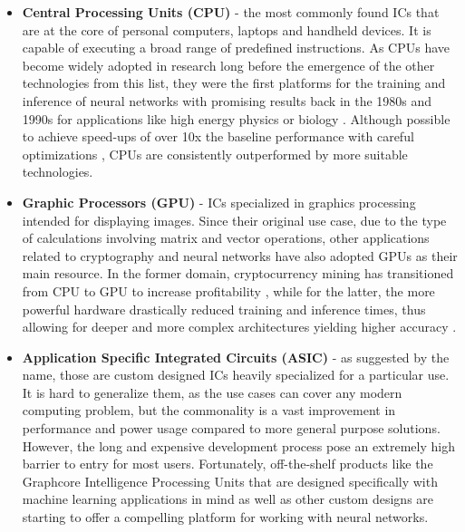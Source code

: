 \begin{itemize}
  \item \textbf{Central Processing Units (CPU)} - the most commonly found ICs that are at the core of personal computers, laptops and handheld devices. It is capable of executing a broad range of predefined instructions. As CPUs have become widely adopted in research long before the emergence of the other technologies from this list, they were the first platforms for the training and inference of neural networks with promising results back in the 1980s and 1990s for applications like high energy physics \cite{17-dagli1989applications} or biology \cite{16-wu1995neural}. Although possible to achieve speed-ups of over 10x the baseline performance with careful optimizations \cite{nn_cpu_optim}, CPUs are consistently outperformed by more suitable technologies.

  \item \textbf{Graphic Processors (GPU)} - ICs specialized in graphics processing intended for displaying images. Since their original use case, due to the type of calculations involving matrix and vector operations, other applications related to cryptography and neural networks have also adopted GPUs as their main resource. In the former domain, cryptocurrency mining has transitioned from CPU to GPU to increase profitability \cite{19-iyer2018gpu}, while for the latter, the more powerful hardware drastically reduced training and inference times, thus allowing for deeper and more complex architectures yielding higher accuracy \cite{20-chen2020gpu-accelerated, 21-zhang2019recent}.

  \item \textbf{Application Specific Integrated Circuits (ASIC)} - as suggested by the name, those are custom designed ICs heavily specialized for a particular use. It is hard to generalize them, as the use cases can cover any modern computing problem, but the commonality is a vast improvement in performance and power usage compared to more general purpose solutions. However, the long and expensive development process pose an extremely high barrier to entry for most users. Fortunately, off-the-shelf products like the Graphcore Intelligence Processing Units \cite{22-graphcoregraphcore} that are designed specifically with machine learning applications in mind as well as other custom designs \cite{23-knag2015sparse, 24-ramanaiah2011asic} are starting to offer a compelling platform for working with neural networks.


\end{itemize}
